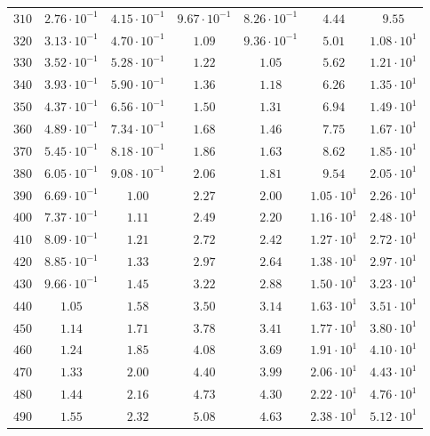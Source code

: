 \begin{table}[h]
\begin{tabular}{lcccccc}
$	310	$ & $	2.76 \cdot 10^{-1} 	$ & $	4.15 \cdot 10^{-1} 	$ & $	9.67 \cdot 10^{-1} 	$ & $	8.26 \cdot 10^{-1} 	$ & $	4.44 	$ & $	9.55 	 $ \\
$	320	$ & $	3.13 \cdot 10^{-1} 	$ & $	4.70 \cdot 10^{-1} 	$ & $	1.09 	$ & $	9.36 \cdot 10^{-1} 	$ & $	5.01 	$ & $	1.08 \cdot 10^{1} 	 $ \\
$	330	$ & $	3.52 \cdot 10^{-1} 	$ & $	5.28 \cdot 10^{-1} 	$ & $	1.22 	$ & $	1.05 	$ & $	5.62 	$ & $	1.21 \cdot 10^{1} 	 $ \\
$	340	$ & $	3.93 \cdot 10^{-1} 	$ & $	5.90 \cdot 10^{-1} 	$ & $	1.36 	$ & $	1.18 	$ & $	6.26 	$ & $	1.35 \cdot 10^{1} 	 $ \\
$	350	$ & $	4.37 \cdot 10^{-1} 	$ & $	6.56 \cdot 10^{-1} 	$ & $	1.50 	$ & $	1.31 	$ & $	6.94 	$ & $	1.49 \cdot 10^{1} 	 $ \\
$	360	$ & $	4.89 \cdot 10^{-1} 	$ & $	7.34 \cdot 10^{-1} 	$ & $	1.68 	$ & $	1.46 	$ & $	7.75 	$ & $	1.67 \cdot 10^{1} 	 $ \\
$	370	$ & $	5.45 \cdot 10^{-1} 	$ & $	8.18 \cdot 10^{-1} 	$ & $	1.86 	$ & $	1.63 	$ & $	8.62 	$ & $	1.85 \cdot 10^{1} 	 $ \\
$	380	$ & $	6.05 \cdot 10^{-1} 	$ & $	9.08 \cdot 10^{-1} 	$ & $	2.06 	$ & $	1.81 	$ & $	9.54 	$ & $	2.05 \cdot 10^{1} 	 $ \\
$	390	$ & $	6.69 \cdot 10^{-1} 	$ & $	1.00 	$ & $	2.27 	$ & $	2.00 	$ & $	1.05 \cdot 10^{1} 	$ & $	2.26 \cdot 10^{1} 	 $ \\
$	400	$ & $	7.37 \cdot 10^{-1} 	$ & $	1.11 	$ & $	2.49 	$ & $	2.20 	$ & $	1.16 \cdot 10^{1} 	$ & $	2.48 \cdot 10^{1} 	 $ \\
$	410	$ & $	8.09 \cdot 10^{-1} 	$ & $	1.21 	$ & $	2.72 	$ & $	2.42 	$ & $	1.27 \cdot 10^{1} 	$ & $	2.72 \cdot 10^{1} 	 $ \\
$	420	$ & $	8.85 \cdot 10^{-1} 	$ & $	1.33 	$ & $	2.97 	$ & $	2.64 	$ & $	1.38 \cdot 10^{1} 	$ & $	2.97 \cdot 10^{1} 	 $ \\
$	430	$ & $	9.66 \cdot 10^{-1} 	$ & $	1.45 	$ & $	3.22 	$ & $	2.88 	$ & $	1.50 \cdot 10^{1} 	$ & $	3.23 \cdot 10^{1} 	 $ \\
$	440	$ & $	1.05 	$ & $	1.58 	$ & $	3.50 	$ & $	3.14 	$ & $	1.63 \cdot 10^{1} 	$ & $	3.51 \cdot 10^{1} 	 $ \\
$	450	$ & $	1.14 	$ & $	1.71 	$ & $	3.78 	$ & $	3.41 	$ & $	1.77 \cdot 10^{1} 	$ & $	3.80 \cdot 10^{1} 	 $ \\
$	460	$ & $	1.24 	$ & $	1.85 	$ & $	4.08 	$ & $	3.69 	$ & $	1.91 \cdot 10^{1} 	$ & $	4.10 \cdot 10^{1} 	 $ \\
$	470	$ & $	1.33 	$ & $	2.00 	$ & $	4.40 	$ & $	3.99 	$ & $	2.06 \cdot 10^{1} 	$ & $	4.43 \cdot 10^{1} 	 $ \\
$	480	$ & $	1.44 	$ & $	2.16 	$ & $	4.73 	$ & $	4.30 	$ & $	2.22 \cdot 10^{1} 	$ & $	4.76 \cdot 10^{1} 	 $ \\
$	490	$ & $	1.55 	$ & $	2.32 	$ & $	5.08 	$ & $	4.63 	$ & $	2.38 \cdot 10^{1} 	$ & $	5.12 \cdot 10^{1} 	 $ \\
    \hline
  \end{tabular}
\end{table}

